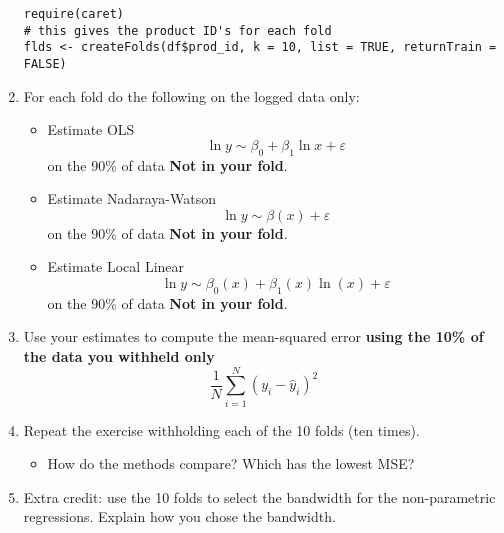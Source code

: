 \documentclass{article}
\begin{document}
\begin{enumerate}
\begin{verbatim}
require(caret)
# this gives the product ID's for each fold
flds <- createFolds(df$prod_id, k = 10, list = TRUE, returnTrain = FALSE)
\end{verbatim}
\item For each fold do the following on the logged data only:
\begin{itemize}
\item Estimate OLS $$\ln y \sim \beta_0 + \beta_1 \ln x +\varepsilon$$ on the 90\% of data \textbf{Not in your fold}.
\item Estimate Nadaraya-Watson $$\ln y \sim \beta(x) +\varepsilon$$ on the 90\% of data \textbf{Not in your fold}.
\item Estimate Local Linear $$\ln y \sim \beta_0(x) + \beta_1(x) \ln(x) + \varepsilon$$ on the 90\% of data \textbf{Not in your fold}.
\end{itemize}
\item Use your estimates to compute the mean-squared error \textbf{using the 10\% of the data you withheld only} $$ \frac{1}{N} \sum_{i=1}^N (y_i - \hat{y}_i)^2$$
\item Repeat the exercise withholding each of the 10 folds (ten times).
\begin{itemize}
\item How do the methods compare? Which has the lowest MSE?
\end{itemize}
\item Extra credit: use the 10 folds to select the bandwidth for the non-parametric regressions. Explain how you chose the bandwidth.
\end{enumerate}
\end{document}
